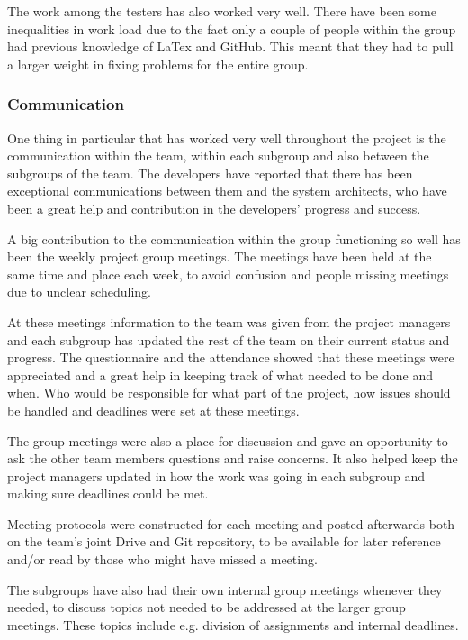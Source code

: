 \documentclass[a4paper]{article}
\begin{document}
The work among the testers has also worked very well. There have been some inequalities in work load due to the fact only a couple of people within the group had previous knowledge of LaTex and GitHub. This meant that they had to pull a larger weight in fixing problems for the entire group.




\subsubsection{Communication}
One thing in particular that has worked very well throughout the project is the communication within the team, within each subgroup and also between the subgroups of the team. The developers have reported that there has been exceptional communications between them and the system architects, who have been a great help and contribution in the developers' progress and success.

A big contribution to the communication within the group functioning so well has been the weekly project group meetings. The meetings have been held at the same time and place each week, to avoid confusion and people missing meetings due to unclear scheduling. 

At these meetings information to the team was given from the project managers and each subgroup has updated the rest of the team on their current status and progress. The questionnaire and the attendance showed that these meetings were appreciated and a great help in keeping track of what needed to be done and when. Who would be responsible for what part of the project, how issues should be handled and deadlines were set at these meetings.

The group meetings were also a place for discussion and gave an opportunity to ask the other team members questions and raise concerns. It also helped keep the project managers updated in how the work was going in each subgroup and making sure deadlines could be met.

Meeting protocols were constructed for each meeting and posted afterwards both on the team's joint Drive and Git repository, to be available for later reference and/or read by those who might have missed a meeting.

The subgroups have also had their own internal group meetings whenever they needed, to discuss topics not needed to be addressed at the larger group meetings. These topics include e.g. division of assignments and internal deadlines.
\end{document}
